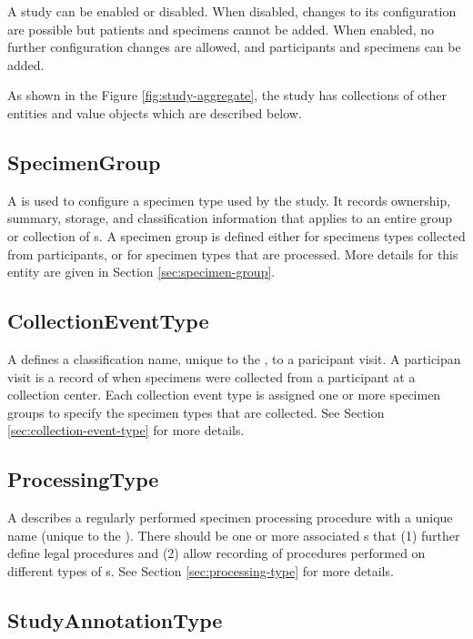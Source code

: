 A study can be enabled or disabled. When disabled, changes to its configuration
are possible but patients and specimens cannot be added. When enabled, no
further configuration changes are allowed, and participants and specimens can
be added.

As shown in the Figure \ref{fig:study-aggregate}, the study has collections of
other entities and value objects which are described below.

\subsection*{SpecimenGroup}

A  is used to configure a specimen type used by the
study.  It records ownership, summary, storage, and classification information
that applies to an entire group or collection of s. A
specimen group is defined either for specimens types collected from
participants, or for specimen types that are processed. More details for this
entity are given in Section \ref{sec:specimen-group}.

\subsection*{CollectionEventType}

A  defines a classification name, unique to
the , to a paricipant visit. A participan visit is a record
of when specimens were collected from a participant at a collection
center. Each collection event type is assigned one or more specimen groups to
specify the specimen types that are collected. See Section
\ref{sec:collection-event-type} for more details.

\subsection*{ProcessingType}

A  describes a regularly performed specimen
processing procedure with a unique name (unique to the
). There should be one or more associated
s that (1) further define legal procedures and (2)
allow recording of procedures performed on different types of
s. See Section \ref{sec:processing-type} for more details.

\subsection*{StudyAnnotationType}

